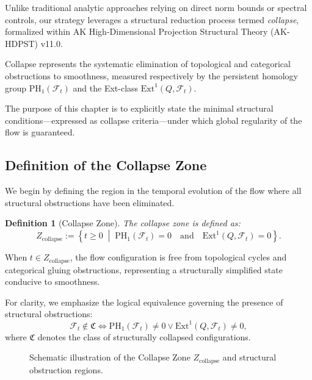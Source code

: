 \documentclass[11pt]{article}
\newtheorem{definition}[theorem]{Definition}
\begin{document}
Unlike traditional analytic approaches relying on direct norm bounds or spectral controls, our strategy leverages a structural reduction process termed \emph{collapse}, formalized within AK High-Dimensional Projection Structural Theory (AK-HDPST) v11.0.

Collapse represents the systematic elimination of topological and categorical obstructions to smoothness, measured respectively by the persistent homology group \( \mathrm{PH}_1(\mathcal{F}_t) \) and the Ext-class \( \mathrm{Ext}^1(Q, \mathcal{F}_t) \).

The purpose of this chapter is to explicitly state the minimal structural conditions—expressed as collapse criteria—under which global regularity of the flow is guaranteed.

\subsection{Definition of the Collapse Zone}

We begin by defining the region in the temporal evolution of the flow where all structural obstructions have been eliminated.

\begin{definition}[Collapse Zone]
The collapse zone is defined as:
\[
Z_{\mathrm{collapse}} := \left\{ t \geq 0 \;\middle|\; \mathrm{PH}_1(\mathcal{F}_t) = 0 \quad \text{and} \quad \mathrm{Ext}^1(Q, \mathcal{F}_t) = 0 \right\}.
\]
\end{definition}

When \( t \in Z_{\mathrm{collapse}} \), the flow configuration is free from topological cycles and categorical gluing obstructions, representing a structurally simplified state conducive to smoothness.

For clarity, we emphasize the logical equivalence governing the presence of structural obstructions:
\[
\mathcal{F}_t \notin \mathfrak{C} \iff \mathrm{PH}_1(\mathcal{F}_t) \neq 0 \lor \mathrm{Ext}^1(Q, \mathcal{F}_t) \neq 0,
\]
where \( \mathfrak{C} \) denotes the class of structurally collapsed configurations.

\begin{figure}[H]
\centering
{}
\caption{Schematic illustration of the Collapse Zone \( Z_{\mathrm{collapse}} \) and structural obstruction regions.}
\end{figure}
\end{document}
